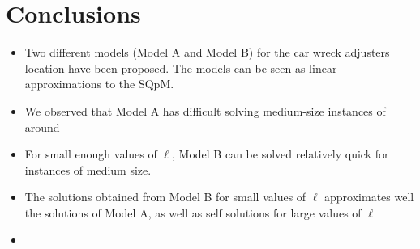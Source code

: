 \chapter{Conclusions}
\label{ch:Conclusions}
\begin{itemize}
\item Two different models (Model A and Model B)
  for the car wreck adjusters location have been proposed. 
  The models can be seen as linear approximations to the SQpM.
\item We observed that Model A
  has difficult solving medium-size instances
  of around 
\item For small enough values of $\ell$,
  Model B can be solved relatively quick
  for instances of medium size.
\item The solutions obtained from Model B
  for small values of $\ell$
  approximates well the solutions of Model A,
  as well as self solutions for large values of $\ell$
\item 
\end{itemize}

